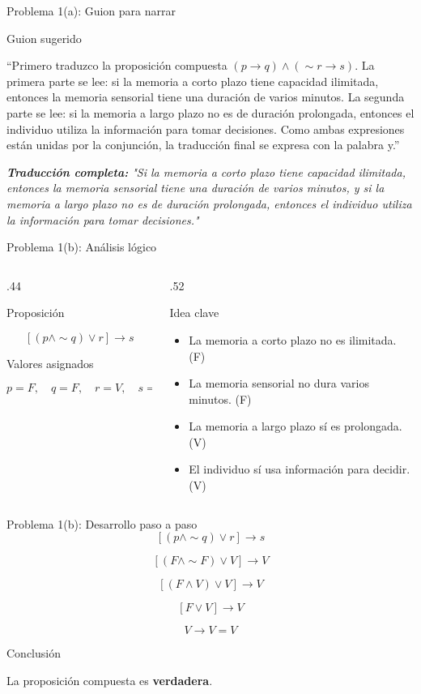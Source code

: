 \documentclass[aspectratio=169,11pt]{beamer}
\newcommand{\BloqueVisual}[2]{
	\begin{block}{#1}
		#2
	\end{block}
}
\newcommand{\BloqueGuion}[1]{
	\begin{exampleblock}{Guion sugerido}
		#1
	\end{exampleblock}
}
\newcommand{\BloqueClave}[1]{
	\begin{alertblock}{Idea clave}
		#1
	\end{alertblock}
}
\begin{document}
	\begin{frame}{Problema 1(a): Guion para narrar}
		\BloqueGuion{
			``Primero traduzco la proposición compuesta \((p\to q)\land(\sim r\to s)\). La primera parte se lee: si la memoria a corto plazo tiene capacidad ilimitada, entonces la memoria sensorial tiene una duración de varios minutos. La segunda parte se lee: si la memoria a largo plazo no es de duración prolongada, entonces el individuo utiliza la información para tomar decisiones. Como ambas expresiones están unidas por la conjunción, la traducción final se expresa con la palabra y.''}
		
			\emph{\textbf{Traducción completa:} "Si la memoria a corto plazo tiene capacidad ilimitada, entonces la memoria sensorial tiene una duración de varios minutos, y si la memoria a largo plazo no es de duración prolongada, entonces el individuo utiliza la información para tomar decisiones."}
	\end{frame}
	
	\begin{frame}{Problema 1(b): Análisis lógico}
		\begin{columns}[T]
			\begin{column}{.44\textwidth}
				\BloqueVisual{Proposición}{
					\[
					[(p\land \sim q)\lor r]\to s
					\]
				}
				\BloqueVisual{Valores asignados}{
					\[
					p=F,\quad q=F,\quad r=V,\quad s=V
					\]
				}
			\end{column}
			\begin{column}{.52\textwidth}
				\BloqueClave{
					\begin{itemize}
						\item La memoria a corto plazo no es ilimitada. (F)
						\item La memoria sensorial no dura varios minutos. (F)
						\item La memoria a largo plazo sí es prolongada. (V)
						\item El individuo sí usa información para decidir. (V)
					\end{itemize}
				}
			\end{column}
		\end{columns}
	\end{frame}
	
	\begin{frame}{Problema 1(b): Desarrollo paso a paso}
		\[
		[(p\land \sim q)\lor r]\to s
		\]
		
		\[
		[(F\land \sim F)\lor V]\to V
		\]
		
		\[
		[(F\land V)\lor V]\to V
		\]
		
		\[
		[F\lor V]\to V
		\]
		
		\[
		V\to V = V
		\]
		
		\BloqueVisual{Conclusión}{
			La proposición compuesta es \textbf{verdadera}.
		}
	\end{frame}
	
\end{document}
